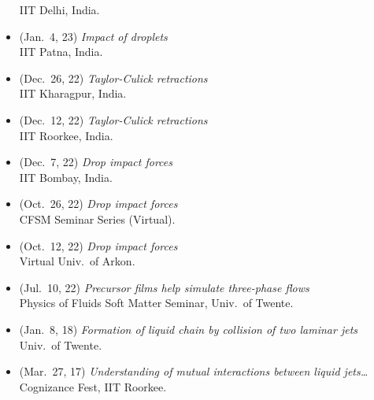 \documentclass[10pt,a4paper,colorlinks,linkcolor=blue,urlcolor=blue,citecolor=blue]{moderncv}
\begin{document}
\begin{itemize}[leftmargin=1.5em]
  IIT Delhi, India.
\item[\textbullet] (Jan.~4, 23) \emph{Impact of droplets} \\
  IIT Patna, India.
\item[\textbullet] (Dec.~26, 22) \emph{Taylor-Culick retractions} \\
  IIT Kharagpur, India.
\item[\textbullet] (Dec.~12, 22) \emph{Taylor-Culick retractions} \\
  IIT Roorkee, India.
\item[\textbullet] (Dec.~7, 22) \emph{Drop impact forces} \\
  IIT Bombay, India.
\item[\textbullet] (Oct.~26, 22) \emph{Drop impact forces} \\
  CFSM Seminar Series (Virtual). \href{https://www.youtube.com/live/enTMAucwUDs?si=Dm-IJ3A0o7AhMc2T}{\color{red}\faYoutube}
\item[\textbullet] (Oct.~12, 22) \emph{Drop impact forces} \\
  Virtual Univ.~of Arkon.
\item[\textbullet] (Jul.~10, 22) \emph{Precursor films help simulate three-phase flows} \\
  Physics of Fluids Soft Matter Seminar, Univ.~of Twente. \href{https://youtu.be/ozrnYe8u1HA?si=DA4JIFjNozmPsQuE}{\color{red}\faYoutube}
\item[\textbullet] (Jan.~8, 18) \emph{Formation of liquid chain by collision of two laminar jets} \\
  Univ.~of Twente.
\item[\textbullet] (Mar.~27, 17) \emph{Understanding of mutual interactions between liquid jets\ldots} \\
  Cognizance Fest, IIT Roorkee.
\end{itemize}
\end{document}
